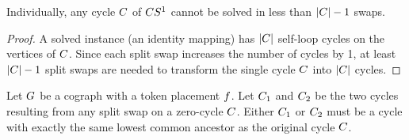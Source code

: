 \documentclass[msc,english,table,xcdraw]{ppgccufmg}
\begin{document}


\begin{lemma}
\label{lem:m_onecycle}
Individually, any cycle $C$ of $CS^{1}$ cannot be solved in less 
than $|C| - 1$ swaps.
\end{lemma}

\begin{proof}
A solved instance (an identity mapping) has $|C|$ self-loop cycles on the vertices of $C$. Since each split swap increases the number of cycles by 1, at least $|C| - 1$ split swaps are needed to transform the single cycle $C$ into $|C|$ cycles.
\end{proof}

\begin{lemma}
\label{lem:zero_split}
Let $G$ be a cograph with a  token placement $f$.
Let $C_{1}$ and $C_{2}$ be the two cycles resulting from any split swap 
on a zero-cycle $C$. 
Either $C_{1}$ or $C_{2}$ must be a cycle with exactly the same lowest common ancestor as the original cycle $C$.
\end{lemma}
\end{document}
